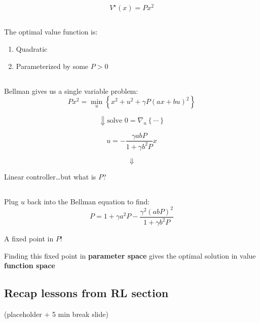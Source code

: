 \documentclass[
  letterpaper,
  DIV=11,
  numbers=noendperiod,
  oneside]{scrartcl}
\providecommand{\tightlist}{%
  \setlength{\itemsep}{0pt}\setlength{\parskip}{0pt}}\usepackage{longtable,booktabs,array}
\begin{document}
\[V^{\star}(x) = P x^2\]

\subsection{}\label{section-18}

The optimal value function is:

\begin{enumerate}
\def\labelenumi{\arabic{enumi}.}
\tightlist
\item
  Quadratic
\item
  Parameterized by some \(P > 0\)
\end{enumerate}

\subsection{}\label{section-19}

Bellman gives us a single variable problem:
\[P x^2 = \min_{u} \left\{ x^2 +  u^2 + \gamma P\left( a x + b u \right)^2 \right\}\]

\[\Downarrow \text{solve } 0 = \nabla_u \left\{ \cdots \right\}\]

\[u = -\frac{\gamma a b P}{1 + \gamma b^2 P} x\]

\[\Downarrow\]

Linear controller\ldots but what is \(P\)?

\subsection{}\label{section-20}

Plug \(u\) back into the Bellman equation to find:
\[P = 1 + \gamma a^2 P - \frac{\gamma^2 (a b P)^2}{1 + \gamma b^2 P}\]

A fixed point in \(P\)!

Finding this fixed point in \textbf{parameter space} gives the optimal
solution in value \textbf{function space}

\subsection{}\label{section-21}

\subsection{Recap lessons from RL
section}\label{recap-lessons-from-rl-section}

(placeholder + 5 min break slide)
\end{document}
